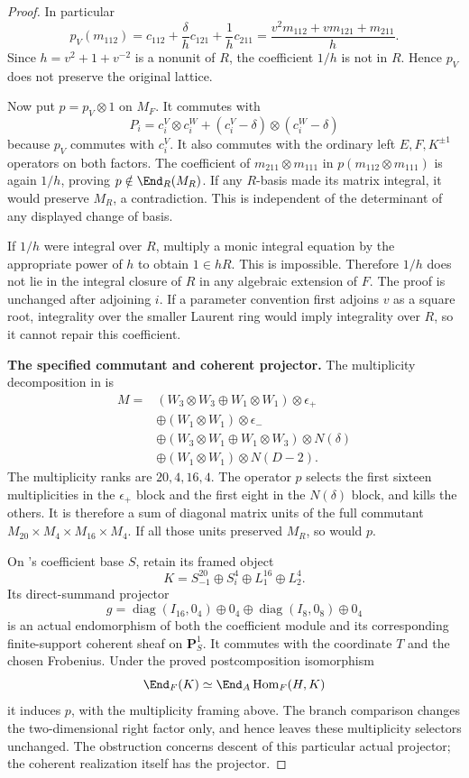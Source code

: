 \begin{proof}
In particular
\[
 p_V(m_{112})
 =c_{112}+\frac{\delta}{h}c_{121}+\frac1h c_{211}
 =\frac{v^2m_{112}+v m_{121}+m_{211}}h.
\]
Since $h=v^2+1+v^{-2}$ is a nonunit of $R$, the coefficient
$1/h$ is not in $R$. Hence $p_V$ does not preserve the
original lattice.

Now put $p=p_V\otimes1$ on $M_F$. It commutes with
\[
 P_i=c_i^V\otimes c_i^W+
       (c_i^V-\delta)\otimes(c_i^W-\delta)
\]
because $p_V$ commutes with $c_i^V$.
It also commutes with the ordinary left $E,F,K^{\pm1}$
operators on both factors. The coefficient of
$m_{211}\otimes m_{111}$ in
$p(m_{112}\otimes m_{111})$ is again $1/h$, proving
$p\notin\End_R(M_R)$.
If any $R$-basis made its matrix integral, it would preserve
$M_R$, a contradiction. This is independent of the determinant
of any displayed change of basis.

If $1/h$ were integral over $R$, multiply a monic integral
equation by the appropriate power of $h$ to obtain $1\in hR$.
This is impossible. Therefore $1/h$ does not lie in the
integral closure of $R$ in any algebraic extension of $F$.
The proof is unchanged after adjoining $i$.
If a parameter convention first adjoins $v$ as a square root,
integrality over the smaller Laurent ring would imply
integrality over $R$, so it cannot repair this coefficient.

\par\smallskip\noindent\textbf{The specified commutant and coherent projector.}\quad
The multiplicity decomposition in  is
\[
 \begin{aligned}
 M={}&(W_3\otimes W_3\oplus W_1\otimes W_1)\otimes\epsilon_+\\
 &\oplus(W_1\otimes W_1)\otimes\epsilon_-\\
 &\oplus(W_3\otimes W_1\oplus W_1\otimes W_3)\otimes N(\delta)\\
 &\oplus(W_1\otimes W_1)\otimes N(D-2).
 \end{aligned}
\]
The multiplicity ranks are $20,4,16,4$.
The operator $p$ selects the first sixteen multiplicities in
the $\epsilon_+$ block and the first eight in the $N(\delta)$
block, and kills the others. It is therefore a sum of diagonal
matrix units of the full commutant
$M_{20}\times M_4\times M_{16}\times M_4$.
If all those units preserved $M_R$, so would $p$.

On 's coefficient base $S$, retain its framed object
\[
 K=S_{-1}^{20}\oplus S_i^4\oplus L_1^{16}\oplus L_2^4.
\]
Its direct-summand projector
\[
 g=\operatorname{diag}(I_{16},0_4)\oplus0_4
   \oplus\operatorname{diag}(I_8,0_8)\oplus0_4
\]
is an actual endomorphism of both the coefficient module and
its corresponding finite-support coherent sheaf on $\mathbf P^1_S$.
It commutes with the coordinate $T$ and the chosen Frobenius.
Under the proved postcomposition isomorphism
\[
 \End_F(K)\simeq
 \End_A\operatorname{Hom}_F(H,K)
\]
it induces $p$, with the multiplicity framing above.
The branch comparison changes the two-dimensional right factor
only, and hence leaves these multiplicity selectors unchanged.
The obstruction concerns descent of this particular actual
projector; the coherent realization itself has the projector.


\end{proof}
